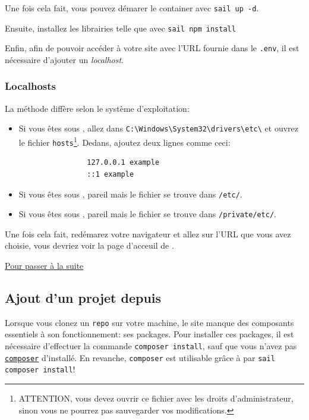         Une fois cela fait, vous pouvez démarer le container avec \verb|sail up -d|.

        Ensuite, installez les librairies \js{} telle que \vite{} avec \verb|sail npm install|

        Enfin, afin de pouvoir accéder à votre site avec l'URL fournie dans le \verb|.env|, il est nécessaire d'ajouter un \textit{localhost}.

        \newpage
        \subsubsection[Localhosts][fr.wikipedia.org/wiki/Localhost]{Localhosts\label{sec:localhost}}
        La méthode diffère selon le système d'exploitation:
        \begin{itemize}
            \item Si vous êtes sous \windows{}, allez dans \verb|C:\Windows\System32\drivers\etc\| et ouvrez le fichier \verb|hosts|\footnote{ATTENTION, vous devez ouvrir ce fichier avec les droits d'administrateur, sinon vous ne pourrez pas sauvegarder vos modifications.}. Dedans, ajoutez deux lignes comme ceci:
            \begin{lstlisting}
                127.0.0.1 example
                ::1 example
            \end{lstlisting}
            \item Si vous êtes sous \linux{}, pareil mais le fichier se trouve dans \verb|/etc/|.
            \item Si vous êtes sous \macos{}, pareil mais le fichier se trouve dans \verb|/private/etc/|.
        \end{itemize}

        Une fois cela fait, redémarez votre navigateur et allez sur l'URL que vous avez choisie, vous devriez voir la page d'acceuil de \laravel{}.

        \hyperref[sec:suite]{Pour passer à la suite}
    
    \newpage
    \subsection[Ajout d'un projet depuis GitHub]{Ajout d'un projet depuis \github{}\label{sec:project_git}}

    Lorsque vous clonez un \texttt{repo} sur votre machine, le site manque des composants essentiels à son fonctionnement: ses packages. Pour installer ces packages, il est nécessaire d'effectuer la commande \verb|composer install|, sauf que vous n'avez pas \texttt{\href{https://getcomposer.org/doc/00-intro.md}{composer}} d'installé. En revanche, \texttt{composer} est utilisable grâce à  \laravelsail{} par \verb|sail composer install|!

